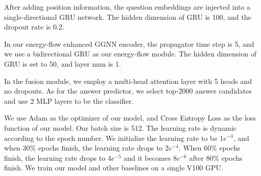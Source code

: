 \documentclass[letterpaper]{article} %
\begin{document}
After adding position information, the question embeddings are injected into a single-directional GRU network. The hidden dimension of GRU is 100, and the dropout rate is 0.2.

In our energy-flow enhanced GGNN encoder, the propagator time step is 5, and we use a bidirectional GRU as our energy-flow module. The hidden dimension of GRU is set to 50, and layer num is 1. 

In the fusion module, we employ a multi-head attention layer with 5 heads and no dropouts. As for the answer predictor, we select top-2000 answer candidates and use 2 MLP layers to be the classifier.

We use Adam as the optimizer of our model, and Cross Entropy Loss as the loss function of our model. Our batch size is 512. The learning rate is dynamic according to the epoch number. We initialize the learning rate to be $1e^{-3}$, and when 30\% epochs finish, the learning rate drops to $2e^{-4}$. When 60\%
epochs finish, the learning rate drops to $4e^{-5}$ and it becomes $8e^{-6}$ after 80\% epochs finish. We train our model and other baselines on a single V100 GPU.

\end{document}
